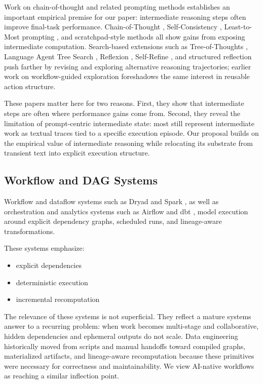 \documentclass{article}
\begin{document}
Work on chain-of-thought and related prompting methods establishes an important empirical premise for our paper: intermediate reasoning steps often improve final-task performance. Chain-of-Thought \cite{wei2022cot}, Self-Consistency \cite{wang2022selfconsistency}, Least-to-Most prompting \cite{zhou2022leasttomost}, and scratchpad-style methods \cite{nye2021scratchpads} all show gains from exposing intermediate computation. Search-based extensions such as Tree-of-Thoughts \cite{yao2023tree}, Language Agent Tree Search \cite{zhou2023lats}, Reflexion \cite{shinn2023reflexion}, Self-Refine \cite{madaan2023selfrefine}, and structured reflection \cite{li2023structuredreflection} push farther by revising and exploring alternative reasoning trajectories; earlier work on workflow-guided exploration \cite{liu2018workflowguided} foreshadows the same interest in reusable action structure.

These papers matter here for two reasons. First, they show that intermediate steps are often where performance gains come from. Second, they reveal the limitation of prompt-centric intermediate state: most still represent intermediate work as textual traces tied to a specific execution episode. Our proposal builds on the empirical value of intermediate reasoning while relocating its substrate from transient text into explicit execution structure.

\subsection{Workflow and DAG Systems}

Workflow and dataflow systems such as Dryad \cite{isard2007dryad} and Spark \cite{zaharia2016spark}, as well as orchestration and analytics systems such as Airflow \cite{airflowdocs} and dbt \cite{dbtdocs}, model execution around explicit dependency graphs, scheduled runs, and lineage-aware transformations.

These systems emphasize:
\begin{itemize}
\item explicit dependencies
\item deterministic execution
\item incremental recomputation
\end{itemize}

The relevance of these systems is not superficial. They reflect a mature systems answer to a recurring problem: when work becomes multi-stage and collaborative, hidden dependencies and ephemeral outputs do not scale. Data engineering historically moved from scripts and manual handoffs toward compiled graphs, materialized artifacts, and lineage-aware recomputation because these primitives were necessary for correctness and maintainability. We view AI-native workflows as reaching a similar inflection point.
\end{document}
